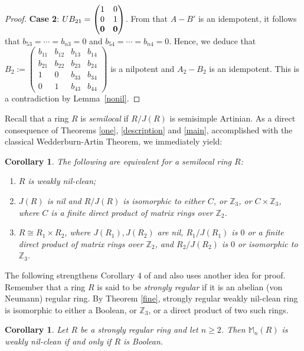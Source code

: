 \documentclass[12]{amsart}
\newtheorem{cor}[thm]{Corollary}
\theoremstyle{definition}
\numberwithin{equation}{section}
\begin{document}
\begin{proof}
{\bf Case 2}: $UB_{21}=\begin{pmatrix}1&0\\
                         0&1\\
                       \bf 0&\bf 0\end{pmatrix}$. From that $A-B'$ is an idempotent, it follows that $b_{53}=\cdots=b_{n3}=0$ and $b_{54}=\cdots=b_{n4}=0$. Hence, we deduce that $B_2:=\begin{pmatrix}b_{11}&b_{12}&b_{13}&b_{14}\\
                       b_{21}&b_{22}&b_{23}&b_{24}\\
                       1&0&b_{33}&b_{34}\\
											0&1&b_{43}&b_{44}\end{pmatrix}$ is a nilpotent and $A_2-B_2$ is an idempotent.	This is a contradiction by Lemma~\ref{nonil}.																																 
\end{proof}

Recall that a ring $R$ is {\it semilocal} if $R/J(R)$ is semisimple Artinian. As a direct consequence of Theorems \ref{one}, \ref{description} and \ref{main}, accomplished with the classical Wedderburn-Artin Theorem, we immediately yield:

\begin{cor} The following are equivalent for a semilocal ring $R$:
\begin{enumerate}
\item $R$ is weakly nil-clean;
\item  $J(R)$ is nil and $R/J(R)$ is isomorphic to either $C$, or $\mathbb Z_3$, or $C\times \mathbb Z_3$, where $C$ is a finite direct product of matrix rings over $\mathbb Z_2$.
\item $R\cong R_1\times R_2$, where $J(R_1), J(R_2)$ are nil, $R_1/J(R_1)$ is $0$ or a finite direct product of matrix rings over $\mathbb Z_2$, and $R_2/J(R_2)$ is $0$ or isomorphic to ${\mathbb Z}_3$.
\end{enumerate}
\end{cor}

The following strengthens Corollary 4 of \cite{KLZ14} and also uses another idea for proof. Remember that a ring $R$ is said to be {\it strongly regular} if it is an abelian (von Neumann) regular ring.  By Theorem \ref{fine},  strongly regular weakly nil-clean ring is isomorphic to either a Boolean, or ${{\mathbb Z}}_3$, or a direct product of two such rings.

\begin{cor}\label{bool} Let $R$ be a strongly regular ring and let $n\geq 2$. Then $\mathbb{M}_n(R)$ is weakly nil-clean if and only if $R$ is Boolean.
\end{cor}
\end{document}
